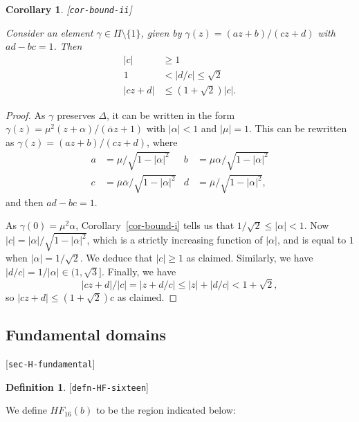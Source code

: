 \documentclass[reqno]{amsart}
\newcommand{\lbl}[1]{\label{#1}\textup{[\texttt{#1}]}\par}
\newcommand{\lbl}{\label}
\newcommand{\Dl}        {\Delta}
\newcommand{\al}        {\alpha}
\newcommand{\gm}        {\gamma}
\newcommand{\ov}[1]     {\overline{#1}}
\newcommand{\sm}        {\setminus}
\renewcommand{\:}{\colon}
\newtheorem{corollary}[theorem]{Corollary}
\theoremstyle{definition}
\newtheorem{definition}[theorem]{Definition}
\begin{document}
\begin{corollary}\lbl{cor-bound-ii}
 Consider an element $\gm\in\Pi\sm\{1\}$, given by
 $\gm(z)=(az+b)/(cz+d)$ with $ad-bc=1$.  Then
 \begin{align*}
  |c| &\geq 1 \\
  1 &< |d/c|\leq \sqrt{2} \\
  |cz+d| &\leq (1+\sqrt{2})|c|.
 \end{align*}
\end{corollary}
\begin{proof}
 As $\gm$ preserves $\Dl$, it can be written in the form
 $\gm(z)=\mu^2(z+\al)/(\ov{\al}z+1)$ with $|\al|<1$ and $|\mu|=1$.
 This can be rewritten as $\gm(z)=(az+b)/(cz+d)$, where
 \begin{align*}
  a &= \mu/\sqrt{1-|\al|^2} &
  b &= \mu\al/\sqrt{1-|\al|^2} \\
  c &= \ov{\mu}\ov{\al}/\sqrt{1-|\al|^2} &
  d &= \ov{\mu}/\sqrt{1-|\al|^2},
 \end{align*}
 and then $ad-bc=1$.

 As $\gm(0)=\mu^2\al$, Corollary~\ref{cor-bound-i} tells us that
 $1/\sqrt{2}\leq|\al|<1$.  Now $|c|=|\al|/\sqrt{1-|\al|^2}$, which is
 a strictly increasing function of $|\al|$, and is equal to $1$ when
 $|\al|=1/\sqrt{2}$.  We deduce that $|c|\geq 1$ as claimed.
 Similarly, we have $|d/c|=1/|\al|\in(1,\sqrt{3}]$.  Finally, we have
 \[ |cz+d|/|c|=|z+d/c| \leq |z|+|d/c| < 1 + \sqrt{2}, \]
 so $|cz+d|\leq (1+\sqrt{2})c$ as claimed.
\end{proof}

\subsection{Fundamental domains}
\lbl{sec-H-fundamental}

\begin{definition}\lbl{defn-HF-sixteen}
 We define $HF_{16}(b)$ to be the region indicated below:
 \begin{center}
 \end{center}
\end{definition}
\end{document}
